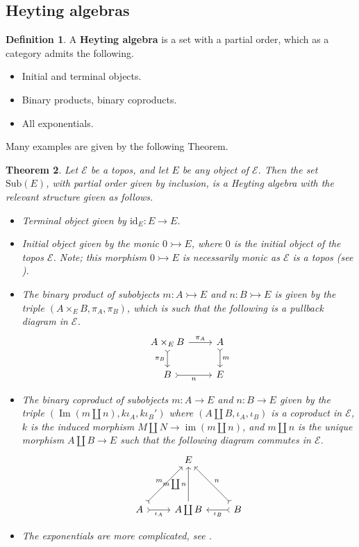 \documentclass{birkjour}
\theoremstyle{plain}
\newtheorem{thm}{Theorem}[subsection] %
\theoremstyle{definition}
\newtheorem{definition}[thm]{Definition} %
\newcommand{\call}[1]{\mathcal{#1}}
\newcommand{\lto}{\longrightarrow}
\begin{document}
	\subsection{Heyting algebras}
	\begin{definition}
		A \textbf{Heyting algebra} is a set with a partial order, which as a category admits the following.
		\begin{itemize}
			\item Initial and terminal objects.
			\item Binary products, binary coproducts.
			\item All exponentials.
		\end{itemize}
	\end{definition}
	Many examples are given by the following Theorem.
	\begin{thm}
		\label{thm:heyting_sub}
		Let $\call{E}$ be a topos, and let $E$ be any object of $\call{E}$. Then the set $\text{Sub}(E)$, with partial order given by inclusion, is a Heyting algebra with the relevant structure given as follows.
		\begin{itemize}
			\item Terminal object given by $\text{id}_E: E \to E$.
			\item Initial object given by the monic $0 \rightarrowtail E$, where $0$ is the initial object of the topos $\call{E}$. Note; this morphism $0 \rightarrowtail E$ is necessarily monic as $\call{E}$ is a topos (see \cite[\S A1.4.1]{Johnstone}).
			\item The binary product of subobjects $m: A \rightarrowtail E$ and $n: B \rightarrowtail E$ is given by the triple $(A \times_{E} B,\pi_A,\pi_B)$, which is such that the following is a pullback diagram in $\call{E}$.
			\[
			\begin{tikzcd}
				A \times_E B\arrow[r,"{\pi_A}"]\arrow[d,swap,rightarrowtail,"{\pi_B}"] & A\arrow[d,rightarrowtail,"m"]\\
				B\arrow[r,swap,rightarrowtail,"{n}"] & E
			\end{tikzcd}
			\]
			\item The binary coproduct of subobjects $m: A \rightarrow E$ and $n: B \rightarrow E$ given by the triple $(\operatorname{Im}(m\coprod n), k\iota_A,k\iota_B')$ where $(A \coprod B, \iota_A,\iota_B)$ is a coproduct in $\call{E}$, $k$ is the induced morphism $M \coprod N \lto \operatorname{im}(m \coprod n)$, and $m \coprod n$ is the unique morphism $A \coprod B \to E$ such that the following diagram commutes in $\call{E}$.
			\[
			\begin{tikzcd}[row sep = huge]
				& E\\
				A\arrow[ur,rightarrowtail,"{m}"]\arrow[r,swap,rightarrowtail,"{\iota_A}"] & A \coprod B\arrow[u,"{m \coprod n}"] & B\arrow[ul,swap,rightarrowtail,"{n}"]\arrow[l,rightarrowtail,"{\iota_B}"]
			\end{tikzcd}
			\]
			\item The exponentials are more complicated, see \cite[\S A1.4.13]{Johnstone}.
		\end{itemize}
	\end{thm}
\end{document}
